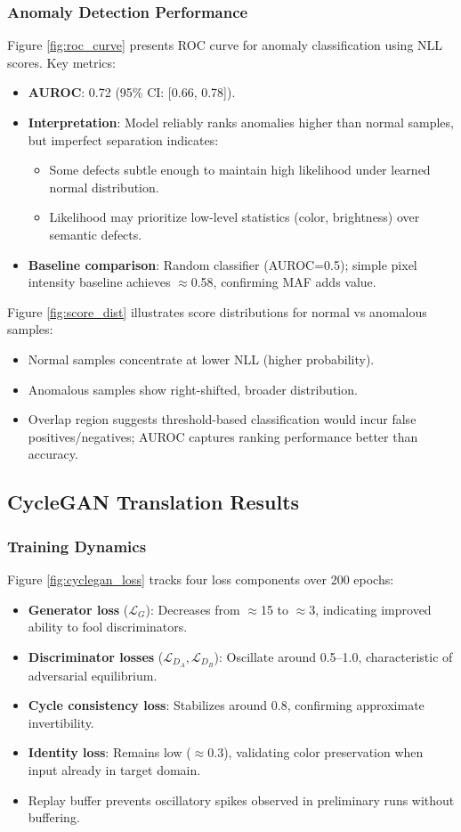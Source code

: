 \documentclass[conference]{IEEEtran}
\begin{document}
\subsubsection{Anomaly Detection Performance}
Figure \ref{fig:roc_curve} presents ROC curve for anomaly classification using NLL scores. Key metrics:
\begin{itemize}
\item \textbf{AUROC}: 0.72 (95\% CI: [0.66, 0.78]).
\item \textbf{Interpretation}: Model reliably ranks anomalies higher than normal samples, but imperfect separation indicates:
  \begin{itemize}
  \item Some defects subtle enough to maintain high likelihood under learned normal distribution.
  \item Likelihood may prioritize low-level statistics (color, brightness) over semantic defects.
  \end{itemize}
\item \textbf{Baseline comparison}: Random classifier (AUROC=0.5); simple pixel intensity baseline achieves $\approx$0.58, confirming MAF adds value.
\end{itemize}

Figure \ref{fig:score_dist} illustrates score distributions for normal vs anomalous samples:
\begin{itemize}
\item Normal samples concentrate at lower NLL (higher probability).
\item Anomalous samples show right-shifted, broader distribution.
\item Overlap region suggests threshold-based classification would incur false positives/negatives; AUROC captures ranking performance better than accuracy.
\end{itemize}

\subsection{CycleGAN Translation Results}
\subsubsection{Training Dynamics}
Figure \ref{fig:cyclegan_loss} tracks four loss components over 200 epochs:
\begin{itemize}
\item \textbf{Generator loss} ($\mathcal{L}_G$): Decreases from $\approx$15 to $\approx$3, indicating improved ability to fool discriminators.
\item \textbf{Discriminator losses} ($\mathcal{L}_{D_A}, \mathcal{L}_{D_B}$): Oscillate around 0.5–1.0, characteristic of adversarial equilibrium.
\item \textbf{Cycle consistency loss}: Stabilizes around 0.8, confirming approximate invertibility.
\item \textbf{Identity loss}: Remains low ($\approx$0.3), validating color preservation when input already in target domain.
\item Replay buffer prevents oscillatory spikes observed in preliminary runs without buffering.
\end{itemize}
\end{document}
